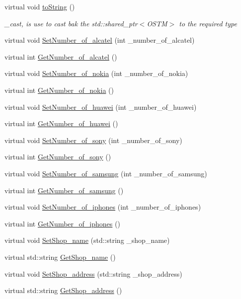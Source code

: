 \begin{DoxyCompactItemize}
virtual void \hyperlink{class_c_a_r_l_o_w___w_a79e683650f861b59752fb027a5f16e5a}{to\+String} ()
\begin{DoxyCompactList}\small\item\em \+\_\+cast, is use to cast bak the std\+::shared\+\_\+ptr$<$\+O\+S\+T\+M$>$ to the required type \end{DoxyCompactList}\item 
virtual void \hyperlink{class_c_a_r_l_o_w___w_ad264954806d7fd6c418650a5c7c7defb}{Set\+Number\+\_\+of\+\_\+alcatel} (int \+\_\+number\+\_\+of\+\_\+alcatel)
\item 
virtual int \hyperlink{class_c_a_r_l_o_w___w_ae7ab8852e5eeff1c2cd397126fbac0e7}{Get\+Number\+\_\+of\+\_\+alcatel} ()
\item 
virtual void \hyperlink{class_c_a_r_l_o_w___w_af0f395409df02a42b3e9448d027d0776}{Set\+Number\+\_\+of\+\_\+nokia} (int \+\_\+number\+\_\+of\+\_\+nokia)
\item 
virtual int \hyperlink{class_c_a_r_l_o_w___w_a4e3a644ee69bc4bc4ab3feac1493192b}{Get\+Number\+\_\+of\+\_\+nokia} ()
\item 
virtual void \hyperlink{class_c_a_r_l_o_w___w_a016d1d51b091fc1732c2923a3baa2f58}{Set\+Number\+\_\+of\+\_\+huawei} (int \+\_\+number\+\_\+of\+\_\+huawei)
\item 
virtual int \hyperlink{class_c_a_r_l_o_w___w_aea38b51a44cda35a01beb7d45fa7a2a4}{Get\+Number\+\_\+of\+\_\+huawei} ()
\item 
virtual void \hyperlink{class_c_a_r_l_o_w___w_ab255132fb2ef5678d00c74f90acdf2dd}{Set\+Number\+\_\+of\+\_\+sony} (int \+\_\+number\+\_\+of\+\_\+sony)
\item 
virtual int \hyperlink{class_c_a_r_l_o_w___w_a6d31219dac9b4d8842e14b7414ed286e}{Get\+Number\+\_\+of\+\_\+sony} ()
\item 
virtual void \hyperlink{class_c_a_r_l_o_w___w_a6e629d8043c4c4266ecafa9f6a3e6447}{Set\+Number\+\_\+of\+\_\+samsung} (int \+\_\+number\+\_\+of\+\_\+samsung)
\item 
virtual int \hyperlink{class_c_a_r_l_o_w___w_aecc697b6d017d88f2bdbe3cea2bf3496}{Get\+Number\+\_\+of\+\_\+samsung} ()
\item 
virtual void \hyperlink{class_c_a_r_l_o_w___w_ad58af9d68450f4fc70e0e1ecd4b1b498}{Set\+Number\+\_\+of\+\_\+iphones} (int \+\_\+number\+\_\+of\+\_\+iphones)
\item 
virtual int \hyperlink{class_c_a_r_l_o_w___w_a50395c707116ea1176743ed98c6b1f76}{Get\+Number\+\_\+of\+\_\+iphones} ()
\item 
virtual void \hyperlink{class_c_a_r_l_o_w___w_a9d0dcf25c0a9eb8be530c27bd2cf8933}{Set\+Shop\+\_\+name} (std\+::string \+\_\+shop\+\_\+name)
\item 
virtual std\+::string \hyperlink{class_c_a_r_l_o_w___w_a68235a63964645c525620053a33de863}{Get\+Shop\+\_\+name} ()
\item 
virtual void \hyperlink{class_c_a_r_l_o_w___w_a6f66cd4c060b2b1ac6640768ad5c56e4}{Set\+Shop\+\_\+address} (std\+::string \+\_\+shop\+\_\+address)
\item 
virtual std\+::string \hyperlink{class_c_a_r_l_o_w___w_af48a2f69706be684115758820ce79ddd}{Get\+Shop\+\_\+address} ()
\end{DoxyCompactItemize}



